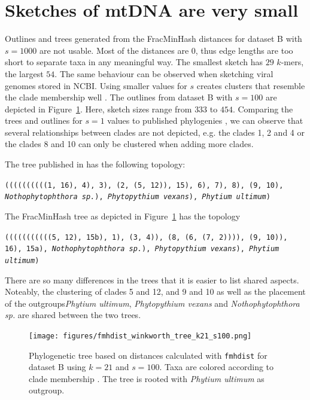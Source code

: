 \section{Sketches of mtDNA are very small}
Outlines and trees generated from the FracMinHash distances for dataset B with
$s=1000$ are not usable. Most of the distances are 0, thus edge lengths are too
short to separate taxa in any meaningful way. The smallest sketch has $29$
$k$-mers, the largest $54$. The same behaviour can be observed when sketching
viral genomes stored in NCBI. Using smaller values for $s$ creates clusters that
resemble the clade membership well
\cite{abadPhytophthoraTaxonomicPhylogenetic2023a,yangExpandedPhylogenyGenus2017}.
The outlines from dataset B with $s=100$ are depicted in
Figure~\ref{fig:winkworthTree}. Here, sketch sizes range from $333$ to $454$.
Comparing the trees and outlines for $s=1$ values to published phylogenies
\cite{abadPhytophthoraTaxonomicPhylogenetic2023a,yangExpandedPhylogenyGenus2017},
we can observe that several relationships between clades are not depicted, e.g.
the clades 1, 2 and 4 or the clades 8 and 10 can only be clustered when adding
more clades.


The tree published in \cite{winkworthComparativeAnalysesComplete2022} has the
following topology:

\texttt{((((((((((1, 16), 4), 3), (2, (5, 12)), 15), 6),
7), 8), (9, 10), \textit{Nothophytophthora sp.}), \textit{Phytopythium vexans}),
\textit{Phytium ultimum})}

The FracMinHash tree as depicted in Figure~\ref{fig:winkworthTree} has the topology

\texttt{(((((((((((5, 12), 15b), 1), (3, 4)), (8, (6, (7, 2)))), (9, 10)), 16),
15a), \textit{Nothophytophthora sp.}), \textit{Phytopythium
vexans}), \textit{Phytium ultimum})}


There are so many differences in the trees that it is easier to list shared
aspects. Noteably, the clustering of clades 5 and 12, and 9 and 10 as well as
the placement of the outgroups\textit{Phytium ultimum}, \textit{Phytopythium
vexans} and \textit{Nothophytophthora sp.} are shared between the two trees.

\begin{figure}
  \centering
  \texttt{[image: figures/fmhdist\_winkworth\_tree\_k21\_s100.png]}
  \caption{Phylogenetic tree based on distances calculated with \texttt{fmhdist}
  for dataset B using $k=21$ and $s=100$. Taxa are colored according to clade
  membership
  \cite{abadPhytophthoraTaxonomicPhylogenetic2023a,winkworthComparativeAnalysesComplete2022}.
  The tree is rooted with \textit{Phytium ultimum} as outgroup.}
  \label{fig:winkworthTree}
\end{figure}

